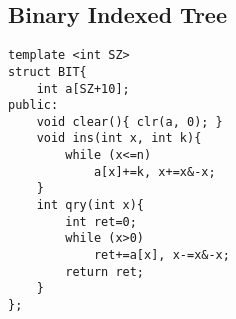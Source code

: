 \subsection{Binary Indexed Tree}
\begin{lstlisting}
template <int SZ>
struct BIT{
    int a[SZ+10];
public:
    void clear(){ clr(a, 0); }
    void ins(int x, int k){
        while (x<=n)
            a[x]+=k, x+=x&-x;
    }
    int qry(int x){
        int ret=0;
        while (x>0)
            ret+=a[x], x-=x&-x;
        return ret;
    }
};
\end{lstlisting}
